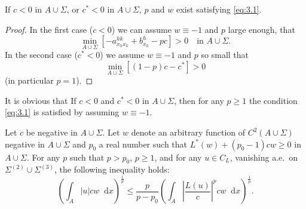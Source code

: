 \documentclass[a4paper,12pt,leqno]{article}
\numberwithin{equation}{section}
\newenvironment{thm}[1]
{\renewcommand\theinnerproblem{#1}\innerproblem}
{\endinnerproblem}
\newcommand{\dd}{\mathop{}\!\mathrm{d}}
\begin{document}
\begin{thm}{II}
	If $c < 0$ in $A\cup\Sigma$, or $c^* < 0$ in $A\cup \Sigma$, $p$ and $w$ exist satisfying \eqref{eq:3.1}.
\end{thm}

\begin{proof}
	In the first case ($c<0$) we can assume $w\equiv-1$ and $p$ large enough, that 
	\begin{equation*} \min_{A\cup\Sigma} \left[-a_{x_{h} x_{k}}^{h k}+b_{x_{h}}^{h}-p c\right]>0 \quad \text{in } A\cup\Sigma.
	\end{equation*}
	In the second case ($c^{*}<0$) we assume $w \equiv-1$ and $p$ so small that
	$$	\min_{A\cup\Sigma} \left[(1-p) c-c^{*}\right]>0$$ (in particular $p=1$).
\end{proof}

It is obvious that
\begin{thm}{III} \label{thm:III}
	If $c<0$ and $c^{*}<0$ in $A \cup \Sigma$, then for any $p \geq 1$ the condition \eqref{eq:3.1} is satisfied by assuming $w \equiv-1$.
\end{thm}

\begin{thm}{IV} \label{thm:IV}
	Let $c$ be negative in $A \cup \Sigma$. 
	Let $w$ denote an arbitrary function of $C^{2}\left(A \cup \Sigma\right)$ negative in $A \cup \Sigma$ and $p_0$ a real number such that $L^*(w)+\left(p_{0}-1\right)cw\geq 0$ in $A \cup \Sigma$. For any $p$ such that $p>p_{0}$, $p\geq 1$, and for any $u \in C_L$, vanishing a.e.\ on 
	$\Sigma^{(2)} \cup \Sigma^{(3)}$, the following inequality holds:
	\begin{equation}
		\label{eq:3.5}
		\boxed{
		\left(\int_{A}|u| c w \dd x\right)^{\frac{1}{p}} \leq \frac{p}{p-p_{0}}\left(\int_{A}\left|\frac{L(u)}{c}\right|^{p} cw \dd x\right)^{\frac{1}{p}}.
		}
	\end{equation}
\end{thm}
\end{document}
